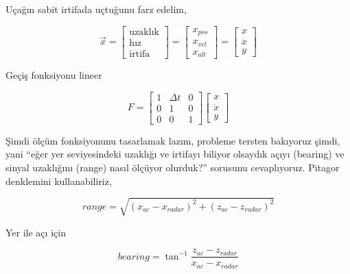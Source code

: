 \documentclass[12pt,fleqn]{article}\usepackage{../../common}
\begin{document}
Uçağın sabit irtifada uçtuğunu farz edelim, 

$$ \vec{x} = 
\left[\begin{array}{c}  
\textrm{uzaklık} \\ \textrm{hız} \\ \textrm{irtifa}
\end{array}\right] = 
\left[\begin{array}{c}  
x_{pos} \\ x_{vel} \\ x_{alt}
\end{array}\right] = 
\left[\begin{array}{c}  
x \\ \dot{x} \\ y
\end{array}\right]
$$

Geçiş fonksiyonu lineer

$$ F = 
\left[\begin{array}{ccc}
1 & \Delta t & 0 \\ 0 & 1 & 0 \\ 0 & 0 & 1
\end{array}\right]
\left[\begin{array}{c} x \\ \dot{x} \\ y \end{array}\right]
$$

Şimdi ölçüm fonksiyonunu tasarlamak lazım, probleme tersten bakıyoruz
şimdi, yani ``eğer yer seviyesindeki uzaklığı ve irtifayı biliyor
olsaydık açıyı (bearing) ve sinyal uzaklığını (range) nasıl ölçüyor
olurduk?'' sorusunu cevaplıyoruz. Pitagor denklemini kullanabiliriz,

$$ range = \sqrt{(x_{ac} - x_{radar})^2 + (z_{ac}-z_{radar})^2 } $$

Yer ile açı için 

$$ bearing = \tan^{-1} \frac{z_{ac}-z_{radar}}{x_{ac}-x_{radar}}$$
\end{document}
